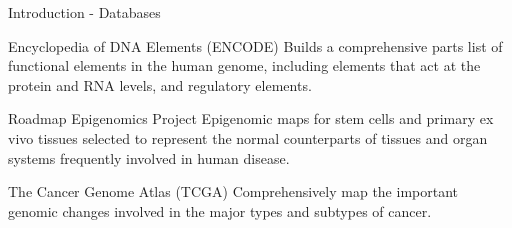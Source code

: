 \documentclass[slidestop,compress,11pt,xcolor=dvipsnames]{beamer}
\begin{document}
\begin{frame}{Introduction - Databases}
\begin{block}{Encyclopedia of DNA Elements (ENCODE)}
Builds a comprehensive parts list of functional elements in the human genome, including elements that act at the protein and RNA levels, and regulatory elements.
\end{block}

\begin{exampleblock}{Roadmap Epigenomics Project}
Epigenomic maps for stem cells and primary ex vivo tissues selected to represent the normal counterparts of tissues and organ systems frequently involved in human disease.
\end{exampleblock}

\begin{alertblock}{The Cancer Genome Atlas  (TCGA)}
Comprehensively map the important genomic changes involved in the major types and subtypes of cancer.
\end{alertblock}

\end{frame}


\end{document}
